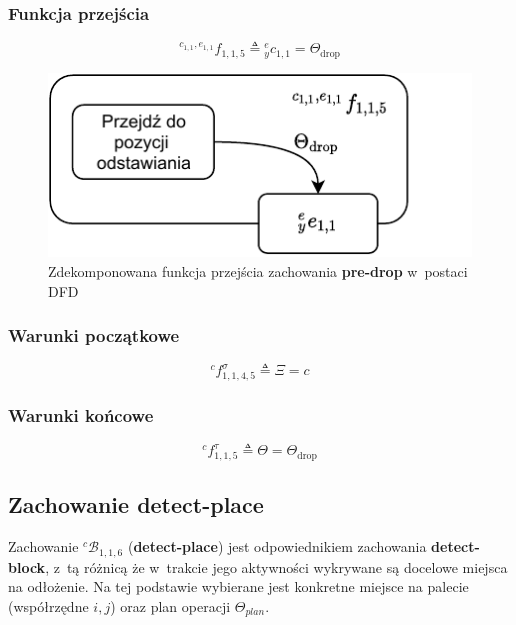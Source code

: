 \subsubsection{Funkcja przejścia}
\begin{equation}
    {}^{c_{1,1}, e_{1,1}}f_{1,1,5} \triangleq {}^{e}_{y}c_{1,1} = \Theta_{\mathrm{drop}}
\end{equation}

\begin{figure}[H]
    \centering
    \includegraphics[width=\columnwidth]{figures/ISR-cs-fp-pre-drop.pdf}
    \caption{Zdekomponowana funkcja przejścia zachowania \textbf{pre-drop} w~postaci DFD}
    \label{fig:cs-fp-pre-drop}
\end{figure}

\subsubsection{Warunki początkowe}
\begin{equation}
    {}^{c}f^{\sigma}_{1,1,4,5} \triangleq \Xi = c
\end{equation}

\subsubsection{Warunki końcowe}
\begin{equation}
    {}^{c}f^{\tau}_{1,1,5} \triangleq \Theta = \Theta_{\mathrm{drop}}
\end{equation}


\subsection{Zachowanie detect-place}
\label{subsec:cs-detect-place}
Zachowanie ${}^{c}\mathcal{B}_{1,1,6}$ (\textbf{detect-place}) jest odpowiednikiem zachowania \textbf{detect-block}, z~tą różnicą że w~trakcie jego aktywności wykrywane są docelowe miejsca na odłożenie. Na tej podstawie wybierane jest konkretne miejsce na palecie (współrzędne $i,j$) oraz plan operacji $\Theta_{plan}$.

